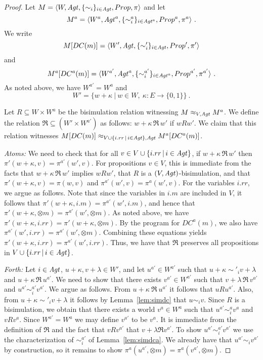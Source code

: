 \documentclass[]{llncs}
\newcommand{\xor}{\otimes}
\newcommand{\Agt}{{\it Agt}}
\newcommand{\xm}{\xor m}
\begin{document}
\begin{proof} 
Let $M = \langle W, \Agt ,\{\sim_{i}\}_{i\in \Agt}, Prop, \pi \rangle$ and
let $$M^a = \langle W^{a}, \Agt^{a}, \{\sim^{a}_{i}\} _{i\in \Agt^a}, Prop^{a}, \pi^{a} \rangle~.$$
We write 
$$M[DC(m)]= \langle W', \Agt ,\{\sim'_{i}\}_{i\in \Agt}, Prop', \pi' \rangle$$ and
$$M^a[DC^a(m)] = \langle W^{a'}, \Agt^{a}, \{\sim^{a'}_{i}\} _{i\in \Agt^a}, Prop^{a'}, \pi^{a'} \rangle~.$$
As noted above, we have $W^{a'} = W^a$ and 
$$W' = \{w+\kappa~| ~w\in W,~\kappa : E \rightarrow \{0,1\}\}~.$$ 

Let $R\subseteq W\times W^a$ be the bisimulation relation witnessing  $M \approx_{V,\Agt} M^a$. 
We define the relation $\Re \subseteq (W' \times W^{a'})$ as follows:
$w+ \kappa \, \Re\, w'$ if $w R w'$. 
We claim that this relation witnesses $M[DC(m)] \approx_{V\cup \{i.rr \,|\, i\in \Agt\}, \Agt} M^a[DC^a(m)]$. 


{\em Atoms:} We need to check that for all $v\in V\cup \{i.rr \,|\, i\in \Agt\}$, 
if $w+ \kappa \, \Re\, w'$ then $\pi'(w+\kappa,v) = \pi^{a'}(w',v)$. For propositions $v\in V$, this 
is immediate from the facts that $w+ \kappa \, \Re\, w'$ implies $w R w'$, that $R$ is a $(V,\Agt)$-bisimulation, 
and that $\pi'(w+ \kappa,v) = \pi(w,v)$ and $\pi^{a'}(w',v) = \pi^{a}(w',v)$. For the variables $i.rr$, we argue as follows. Note that since 
the variables in $i.m$ are included in $V$, it follows that $\pi'(w+\kappa,i.m) = \pi^{a'}(w',i.m)$, 
and hence that  $\pi'(w+ \kappa,\xm) = \pi^{a'}(w',\xm)$.
As noted above, we have 
$\pi'(w+ \kappa,i.rr)  =   \pi'(w+ \kappa,\xm)$. 
By the program for $DC^a(m)$, we also have 
$\pi^{a'}(w',i.rr)= \pi^{a'}(w',\xm)$. 
Combining these equations yields $\pi'(w+ \kappa,i.rr) = \pi^{a'}(w',i.rr)$. 
Thus, we have that $\Re$ preserves all propositions in $V\cup \{i.rr \,|\, i\in \Agt\}$. 


\textit{Forth:} Let $i\in \Agt$, $u+\kappa, v+\lambda \in W'$, and let $u^{a'} \in W^{a'}$ 
such that  $u+\kappa \sim' _{i} v+\lambda$
and $u+\kappa \,\Re\, u^{a'}$. We need to show that there exists $v^{a'} \in W^{a'}$ 
such that $v+\lambda\, \Re \,v^{a'}$ and $u^{a'} \sim^{a'}_{i} v^{a'}$. 
We argue as follows. From $u+\kappa ~ \Re ~ u^{a'}$ it follows that 
$u R u^{a'}$.  Also,  from $u+\kappa \sim'_{i} v+\lambda$ it follows 
by Lemma~\ref{lem:simdc} that $u \sim_{i} v$.
Since $R$ is a bisimulation, we obtain that there exists a world $v^a \in W^a$
such that $u^{a'} \sim^{a}_{i} v^a$ and $v R v^{a}$. Since $W^{a'} = W^{a}$ we may 
define $v^{a'}$ to be $v^a$. It is immediate from the definition of $\Re$ 
and the fact that $v R v^{a'}$ that $v +\lambda \Re v^{a'}$. 
To show   $u^{a'} \sim^{a'}_{i} v^{a'}$ we use the characterization of  $\sim^{a'}_{i} $
of Lemma~\ref{lem:simdca}. We already have that $u^{a'} \sim_{i} v^{a'}$ by construction, 
so it remains to show $\pi^a(u^{a'},\xm) = \pi^a(v^{a'},\xm)$. 


\end{proof}
\end{document}
